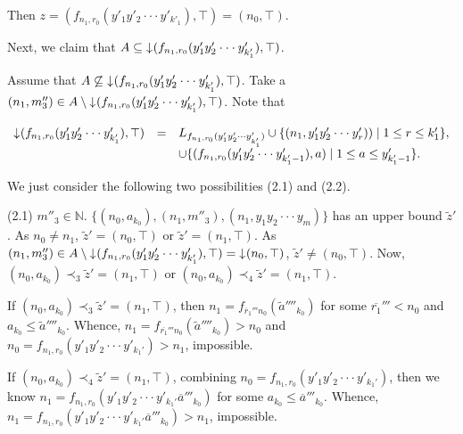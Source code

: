 \documentclass[preprint,12pt]{elsarticle}
\numberwithin{equation}{section}
\newcommand{\dn}{\mathord{\downarrow}\hspace{0.05em}}
\begin{document}
Then $z=(f_{n_{1},r_{0}}(y'_{1}y'_{2}\cdot\cdot\cdot y'_{k'_{1}}),\top)=(n_{0},\top)$.

Next, we claim that $A\subseteq\dn(f_{n_{1},r_{0}}(y'_{1}y'_{2}\cdot\cdot\cdot y'_{k'_{1}}),\top)$.

Assume that $A\not\subseteq\dn(f_{n_{1},r_{0}}(y'_{1}y'_{2}\cdot\cdot\cdot y'_{k'_{1}}),\top)$. Take a $(n_{1},m''_{3})\in A\setminus\dn(f_{n_{1},r_{0}}(y'_{1}y'_{2}\cdot\cdot\cdot y'_{k'_{1}}),\top)$. Note that
\begin{center}$\begin{array}{lll}
\dn(f_{n_{1},r_{0}}(y'_{1}y'_{2}\cdot\cdot\cdot y'_{k_{1}'}),\top)&=&L_{f_{n_{1},r_{0}}(y'_{1}y'_{2}\cdot\cdot\cdot y'_{k_{1}'})}\cup\{(n_{1},y'_{1}y'_{2}\cdot\cdot\cdot y'_{r}))\mid 1\leq r\leq k_{1}'\},\\
&& \cup\{(f_{n_{1},r_{0}}(y'_{1}y'_{2}\cdot\cdot\cdot y'_{k_{1}'-1}),a)\mid 1\leq a\leq y'_{k_{1}'-1}\}.\\
\end{array}$\end{center}
We just consider the following two possibilities (2.1) and (2.2).

(2.1) $m''_{3}\in\mathbb{N}$. $\{(n_{0},a_{k_{0}}),(n_{1},m''_{3}),(n_{1},y_{1}y_{2}\cdot\cdot\cdot y_{m})\}$ has an upper bound $\widetilde{z}'$. As $n_{0}\neq n_{1}$, $\widetilde{z}'=(n_{0},\top)$ or $\widetilde{z}'=(n_{1},\top)$. As $(n_{1},m''_{3})\in A\setminus\dn(f_{n_{1},r_{0}}(y'_{1}y'_{2}\cdot\cdot\cdot y'_{k_{1}'}),\top)=\dn(n_{0},\top)$, $\widetilde{z}'\neq(n_{0},\top)$. Now, $(n_{0},a_{k_{0}})\prec_{3}\widetilde{z}'=(n_{1},\top)$ or $(n_{0},a_{k_{0}})\prec_{4}\widetilde{z}'=(n_{1},\top)$.

If $(n_{0},a_{k_{0}})\prec_{3}\widetilde{z}'=(n_{1},\top)$, then $n_{1}=f_{\overline{r}_{1}'''n_{0}}(\widetilde{a}''''_{k_{0}})$ for some $\overline{r_{1}}'''<n_{0}$ and  $a_{k_{0}}\leq\widetilde{a}''''_{k_{0}}$. Whence, $n_{1}=f_{\overline{r_{1}}'''n_{0}}(\widetilde{a}''''_{k_{0}})>n_{0}$ and $n_{0}=f_{n_{1},r_{0}}(y'_{1}y'_{2}\cdot\cdot\cdot y'_{k_{1}'})>n_{1}$, impossible.

If $(n_{0},a_{k_{0}})\prec_{4}\widetilde{z}'=(n_{1},\top)$, combining $n_{0}=f_{n_{1},r_{0}}(y'_{1}y'_{2}\cdot\cdot\cdot y'_{k_{1}'})$, then we know $n_{1}=f_{n_{1},r_{0}}(y'_{1}y'_{2}\cdot\cdot\cdot y'_{k_{1}'}\overline{a}'''_{k_{0}})$ for some $a_{k_{0}}\leq \overline{a}'''_{k_{0}}$. Whence, $n_{1}=f_{n_{1},r_{0}}(y'_{1}y'_{2}\cdot\cdot\cdot y'_{k_{1}'}\overline{a}'''_{k_{0}})>n_{1}$, impossible.
\end{document}

